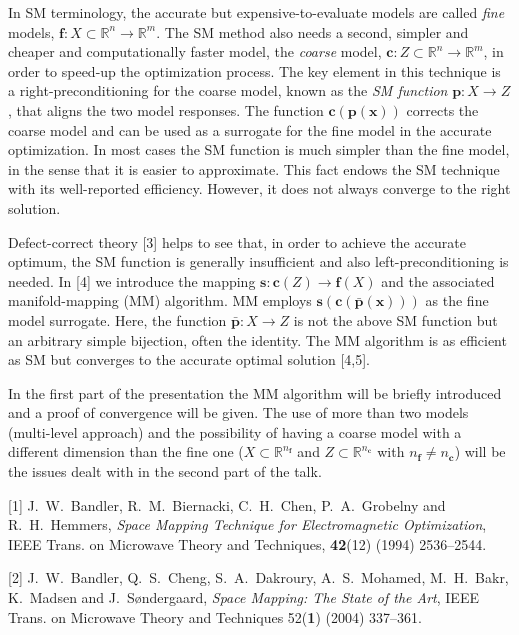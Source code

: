 \documentclass[twosided]{report}
\newcommand{\Reals}{\mathbb{R}}
\begin{document}
In SM terminology, the accurate but
expensive-to-evaluate models are called {\it fine} models,
${\mathbf f}:X \subset \Reals^n \to \Reals^m$.
The SM method also
needs a second, simpler and cheaper and computationally
faster model, the {\it coarse} model,
${\mathbf c}:Z \subset \Reals^n \to \Reals^m$,
in order to speed-up the optimization
process. The key element in this technique is a
right-preconditioning for the coarse model, known as the
{\it SM function}
${\mathbf p}:X \to Z$, that aligns the two
model responses.
The function ${\mathbf c}({\mathbf p}({\mathbf x}))$
corrects the coarse model and
can be used as a surrogate for the fine
model in the accurate optimization. In most cases the SM
function is much simpler than the fine model, in the sense
that it is easier to approximate. This fact endows the SM
technique with its well-reported efficiency. However, it
does not always converge to the right solution.


Defect-correct theory [3] helps to see that, in order
to achieve the accurate optimum, the SM function is
generally insufficient and also left-preconditioning is
needed.  In [4] we introduce the mapping
${\mathbf s}:{\mathbf c}(Z) \to {\mathbf f}(X)$
and the associated
manifold-mapping (MM) algorithm. MM employs
${\mathbf s}({\mathbf c}({\bar{{\mathbf p}}}({\mathbf x})))$
as the fine model surrogate. Here, the
function ${\bar{{\mathbf p}}}:X \to Z$
is not the above SM function but an
arbitrary simple bijection, often the identity.
The MM algorithm is as efficient as SM but converges
to the accurate optimal solution [4,5].

In the first part of the presentation the MM algorithm will
be briefly introduced and a proof of convergence will be
given. The use of more than two models (multi-level
approach) and the possibility of having a coarse model with
a different dimension than the fine one
($X \subset \Reals^{n_{\mathbf f}}$
and $Z \subset \Reals^{n_{\mathbf c}}$ with
$n_{\mathbf f} \neq n_{\mathbf c}$)
will be the issues dealt with in the second part of
the talk.

[1]
J.~W.~Bandler, R.~M.~Biernacki,
C.~H.~Chen, P.~A.~Grobelny and R.~H.~Hemmers,
{\em Space
Mapping Technique for Electromagnetic Optimization},
IEEE Trans. on Microwave Theory and Techniques,
{\bf 42}(12) (1994) 2536--2544.

[2]
J.~W.~Bandler, Q.~S.~Cheng, S.~A.~Dakroury, A.~S.~Mohamed,
M.~H.~Bakr, K.~Madsen and J.~S{\o}ndergaard,
{\em Space Mapping: The State of the Art},
IEEE Trans. on
Microwave Theory and Techniques 52({\bf 1}) (2004)
337--361.
\end{document}
